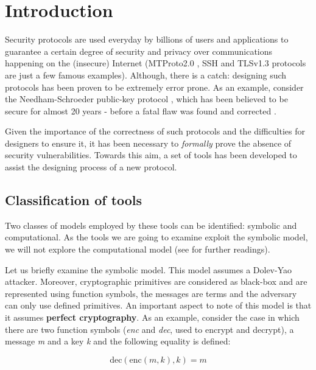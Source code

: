 
\section{Introduction}
\label{section:introduction}

Security protocols are used everyday by billions of users and applications to guarantee a certain degree of security and privacy over communications happening on the (insecure) Internet (MTProto2.0 \cite{Telegram-MTProto2.0}, SSH \cite{rfc4251} and TLSv1.3 \cite{TLSv1.3_specs} protocols are just a few famous examples). Although, there is a catch: designing such protocols has been proven to be extremely error prone. As an example, consider the Needham-Schroeder public-key protocol \cite{NSPK}, which has been believed to be secure for almost 20 years - before a fatal flaw was found and corrected \cite{NSPK_LoweGavin}.

Given the importance of the correctness of such protocols and the difficulties for designers to ensure it, it has been necessary to \textit{formally} prove the absence of security vulnerabilities. Towards this aim, a set of tools has been developed to assist the designing process of a new protocol.

\subsection{Classification of tools}

Two classes of models employed by these tools can be identified: symbolic and computational. As the tools we are going to examine exploit the symbolic model, we will not explore the computational model (see \cite{ReconcilingComputationalSymbolic, SymbolicComputationalBlanchet, 10.1007/978-3-540-31987-0_12} for further readings).

Let us briefly examine the symbolic model. This model assumes a Dolev-Yao \cite{Dolev-Yao} attacker. Moreover, cryptographic primitives are considered as black-box and are represented using function symbols, the messages are terms and the adversary can only use defined primitives. An important aspect to note of this model is that it assumes \textbf{perfect cryptography}. As an example, consider the case in which there are two function symbols (\textit{enc} and \textit{dec}, used to encrypt and decrypt), a message \textit{m} and a key \textit{k} and the following equality is defined:

\begin{equation}
    \label{eq:perfect-crypto}
    \mbox{dec}\left(\mbox{enc}\left(m, k\right), k\right) = m
\end{equation}

